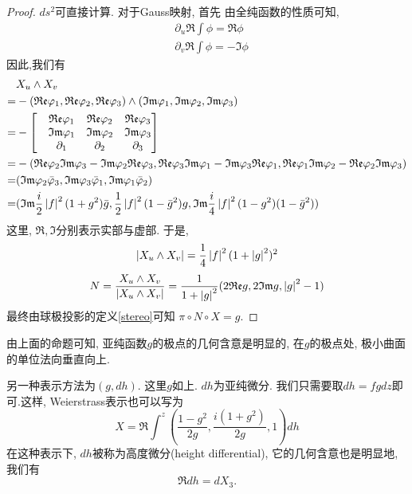 \begin{proof}
    $ds^2$可直接计算. 对于Gauss映射, 首先 由全纯函数的性质可知, 
    \begin{align}
        &\partial_u \Re \int \phi= \Re \phi \\
        &\partial_v \Re \int \phi= -\Im \phi
    \end{align}
    因此,我们有
    \begin{equation}
        \begin{split}
            &X_u \wedge X_v  \\
            =&-({\mathfrak{Re}} \varphi_1,{\mathfrak{Re}} \varphi_2, {\mathfrak{Re}} \varphi_3) \wedge ({\mathfrak{Im}} \varphi_1, {\mathfrak{Im}} \varphi_2, {\mathfrak{Im}} \varphi_3) \\
            =&- \begin{bmatrix}
                &{\mathfrak{Re}} \varphi_1 & {\mathfrak{Re}} \varphi_2 &{\mathfrak{Re}} \varphi_3 \\
                &{\mathfrak{Im}} \varphi_1 & {\mathfrak{Im}} \varphi_2 &{\mathfrak{Im}} \varphi_3 \\
                &\partial_1 & \partial_2 &\partial_3
            \end{bmatrix} \\
            =&-({\mathfrak{Re}}\varphi_2 {\mathfrak{Im}} \varphi_3- {\mathfrak{Im}} \varphi_2 {\mathfrak{Re}} \varphi_3, {\mathfrak{Re}} \varphi_3 {\mathfrak{Im}} \varphi_1- {\mathfrak{Im}}\varphi_3 {\mathfrak{Re}} \varphi_1, {\mathfrak{Re}} \varphi_1 {\mathfrak{Im}} \varphi_2 - {\mathfrak{Re}}\varphi_2 {\mathfrak{Im}} \varphi_3) \\
            =&({\mathfrak{Im}} \varphi_2 \bar{\varphi}_3, {\mathfrak{Im}} \varphi_3 \bar{\varphi}_1, {\mathfrak{Im}} \varphi_1 \bar{\varphi}_2) \\
            =&({\mathfrak{Im}} \frac{i}{2}\left | f \right |^2(1+g^2)\bar{g}, \frac{1}{2}\left | f \right |^2(1-\bar{g}^2)g, {\mathfrak{Im}} \frac{i}{4}\left | f \right |^2(1-g^2)(1-\bar{g}^2)) \\
        \end{split}
    \end{equation}
    这里, $\Re, \Im$分别表示实部与虚部. 于是, 
    \begin{equation}
        \left | X_u \wedge X_v \right |=\frac{1}{4}\left | f \right |^2(1+\left | g \right |^2)^2
    \end{equation}
    \begin{equation}
        N=\frac{X_u\wedge X_v}{\left | X_u\wedge X_v \right |}= \frac{1}{1+\left | g \right |^2}(2{\mathfrak{Re}} g, 2 {\mathfrak{Im}} g, \left | g \right |^2-1)
    \end{equation}
    最终由球极投影的定义\eqref{stereo}可知 $\pi\circ N \circ X=g$.
\end{proof}
由上面的命题可知, 亚纯函数$g$的极点的几何含意是明显的, 在$g$的极点处, 极小曲面的单位法向垂直向上.
\par 另一种表示方法为$(g,dh)$. 这里$g$如上. $dh$为亚纯微分. 我们只需要取$dh=fgdz$即可.这样, Weierstrass表示也可以写为
\begin{equation}
    X=\Re \int^z (\frac{1-g^2}{2g}, \frac{i(1+g^2)}{2g},1)dh
\end{equation}
在这种表示下, $dh$被称为高度微分(height differential), 它的几何含意也是明显地, 我们有
\begin{equation}
    \Re dh= dX_3.
\end{equation}
